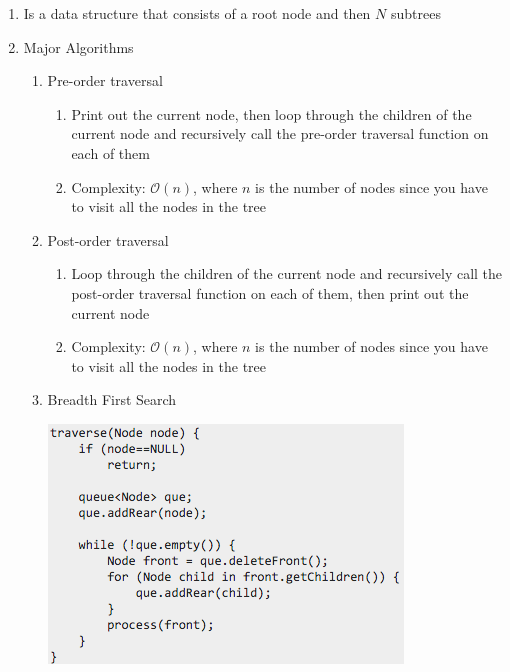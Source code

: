 \documentclass [12pt, executivepaper]{article}
\begin{document}
\begin{enumerate}
\begin{enumerate}
\item Is a data structure that consists of a root node and then $N$ subtrees

\item Major Algorithms

\begin{enumerate}

\item Pre-order traversal

\begin{enumerate}

\item Print out the current node, then loop through the children of the current node and recursively call the pre-order traversal function on each of them

\item Complexity: $\mathcal{O}(n)$, where $n$ is the number of nodes since you have to visit all the nodes in the tree

\end{enumerate}

\item Post-order traversal

\begin{enumerate}

\item Loop through the children of the current node and recursively call the post-order traversal function on each of them, then print out the current node

\item Complexity: $\mathcal{O}(n)$, where $n$ is the number of nodes since you have to visit all the nodes in the tree

\end{enumerate}

\item Breadth First Search

\vspace{1mm} 

\includegraphics[scale=0.5]{BreadthFirstSearchN-aryTree}


\end{enumerate}
\end{enumerate}
\end{enumerate}
\end{document}
